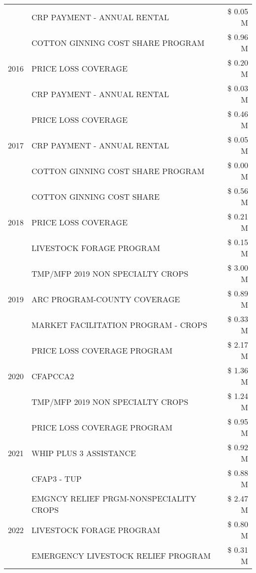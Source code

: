 \begin{tabular}{llr}
 & CRP PAYMENT - ANNUAL RENTAL & \$ 0.05 M \\
\cline{1-3}
\multirow[t]{3}{*}{2016} & COTTON GINNING COST SHARE PROGRAM & \$ 0.96 M \\
 & PRICE LOSS COVERAGE & \$ 0.20 M \\
 & CRP PAYMENT - ANNUAL RENTAL & \$ 0.03 M \\
\cline{1-3}
\multirow[t]{3}{*}{2017} & PRICE LOSS COVERAGE & \$ 0.46 M \\
 & CRP PAYMENT - ANNUAL RENTAL & \$ 0.05 M \\
 & COTTON GINNING COST SHARE PROGRAM & \$ 0.00 M \\
\cline{1-3}
\multirow[t]{3}{*}{2018} & COTTON GINNING COST SHARE & \$ 0.56 M \\
 & PRICE LOSS COVERAGE & \$ 0.21 M \\
 & LIVESTOCK FORAGE PROGRAM & \$ 0.15 M \\
\cline{1-3}
\multirow[t]{3}{*}{2019} & TMP/MFP 2019 NON SPECIALTY CROPS & \$ 3.00 M \\
 & ARC PROGRAM-COUNTY COVERAGE & \$ 0.89 M \\
 & MARKET FACILITATION PROGRAM - CROPS & \$ 0.33 M \\
\cline{1-3}
\multirow[t]{3}{*}{2020} & PRICE LOSS COVERAGE PROGRAM & \$ 2.17 M \\
 & CFAPCCA2 & \$ 1.36 M \\
 & TMP/MFP 2019 NON SPECIALTY CROPS & \$ 1.24 M \\
\cline{1-3}
\multirow[t]{3}{*}{2021} & PRICE LOSS COVERAGE PROGRAM & \$ 0.95 M \\
 & WHIP PLUS 3 ASSISTANCE & \$ 0.92 M \\
 & CFAP3 - TUP & \$ 0.88 M \\
\cline{1-3}
\multirow[t]{3}{*}{2022} & EMGNCY RELIEF PRGM-NONSPECIALITY CROPS & \$ 2.47 M \\
 & LIVESTOCK FORAGE PROGRAM & \$ 0.80 M \\
 & EMERGENCY LIVESTOCK RELIEF PROGRAM & \$ 0.31 M \\
\cline{1-3}
\bottomrule
\end{tabular}

